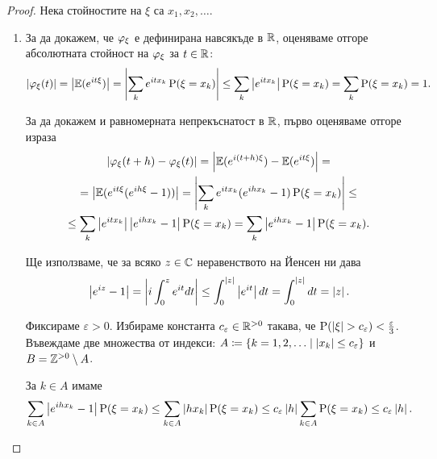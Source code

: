 \documentclass[numbers=endperiod, DIV=15, bibliography=totocnumbered]{scrartcl}
\begin{document}
\begin{proof}
  Нека стойностите на $\xi$ са $x_1, x_2, \ldots$.

  \begin{enumerate}
    \item За да докажем, че $\varphi_\xi$ е дефинирана навсякъде в $\mathbb{R}$, оценяваме отгоре абсолютната стойност на $\varphi_\xi$ за $t \in \mathbb{R}$:
    \begin{displaymath}
      \left\vert \varphi_\xi(t) \right\vert
      =
      \left\vert \mathbb{E}(e^{it\xi}) \right\vert
      =
      \left\vert \sum_k e^{it x_k} \operatorname{P}(\xi = x_k) \right\vert
      \leq
      \sum_k \left\vert e^{it x_k} \right\vert \operatorname{P}(\xi = x_k)
      =
      \sum_k \operatorname{P}(\xi = x_k)
      =
      1.
    \end{displaymath}

    За да докажем и равномерната непрекъснатост в $\mathbb{R}$, първо оценяваме отгоре израза
    \begin{multline*}
      \left\vert \varphi_\xi(t + h) - \varphi_\xi(t) \right\vert
      =
      \left\vert \mathbb{E}(e^{i(t + h)\xi}) - \mathbb{E}(e^{it\xi}) \right\vert
      = \\ =
      \left\vert \mathbb{E}(e^{it\xi} (e^{ih\xi} - 1)) \right\vert
      =
      \left\vert \sum_k e^{it x_k} (e^{ih x_k} - 1) \operatorname{P}(\xi = x_k) \right\vert
      \leq \\ \leq
      \sum_k \left\vert e^{it x_k} \right\vert \left\vert e^{ih x_k} - 1 \right\vert \operatorname{P}(\xi = x_k)
      =
      \sum_k \left\vert e^{ih x_k} - 1 \right\vert \operatorname{P}(\xi = x_k).
    \end{multline*}

    Ще използваме, че за всяко $z \in \mathbb{C}$ неравенството на Йенсен ни дава
    \begin{displaymath}
      \left\vert e^{iz} - 1 \right\vert
      =
      \left\vert i \int_0^z e^{it} dt \right\vert
      \leq
      \int_0^{\left\vert z \right\vert} \left\vert e^{it} \right\vert dt
      =
      \int_0^{\left\vert z \right\vert} dt
      =
      \left\vert z \right\vert.
    \end{displaymath}

    Фиксираме $\varepsilon > 0$. Избираме константа $c_\varepsilon \in \mathbb{R}^{> 0}$ такава, че $\operatorname{P}(\left\vert \xi \right\vert > c_\varepsilon) < \frac \varepsilon 3$.
    Въвеждаме две множества от индекси: $A \coloneqq \{ k = 1, 2, \ldots \mid \left\vert x_k \right\vert \leq c_\varepsilon \}$ и $B = \mathbb{Z}^{> 0} \setminus A$.

    За $k \in A$ имаме
    \begin{displaymath}
      \sum_{k \in A} \left\vert e^{ih x_k} - 1 \right\vert \operatorname{P}(\xi = x_k)
      \leq
      \sum_{k \in A} \left\vert h x_k \right\vert \operatorname{P}(\xi = x_k)
      \leq
      c_\varepsilon \left\vert h \right\vert \sum_{k \in A} \operatorname{P}(\xi = x_k)
      \leq
      c_\varepsilon \left\vert h \right\vert.
    \end{displaymath}


\end{enumerate}
\end{proof}
\end{document}
